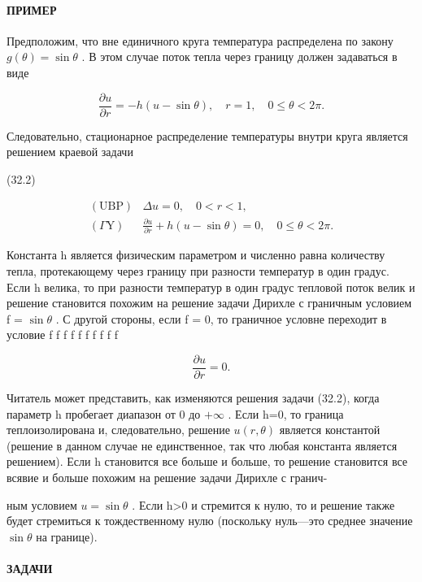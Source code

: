 \documentclass[
  ukrainian,
]{article}
\begin{document}
\paragraph{ПРИМЕР}\label{ux43fux440ux438ux43cux435ux440}

Предположим, что вне единичного круга температура распределена по закону
\(g(\theta) = \sin \theta\) . В этом случае поток тепла через границу
должен задаваться в виде

\[
\frac{\partial u}{\partial r} = -h(u - \sin \theta), \quad r = 1, \quad 0 \le \theta < 2\pi.
\]

Следовательно, стационарное распределение температуры внутри круга
является решением краевой задачи

(32.2)

\[
\begin{array}{ll} (\text{UBP}) & \Delta u = 0, \quad 0 < r < 1, \\ (\Gamma \text{Y}) & \frac{\partial u}{\partial r} + h \left( u - \sin \theta \right) = 0, \quad 0 \leqslant \theta < 2\pi. \end{array}
\]

Константа h является физическим параметром и численно равна количеству
тепла, протекающему через границу при разности температур в один градус.
Если h велика, то при разности температур в один градус тепловой поток
велик и решение становится похожим на решение задачи Дирихле с граничным
условием f = \(\sin \theta\) . С другой стороны, если f = 0, то
граничное условне переходит в условие f f f f f f f f f f

\[
\frac{\partial u}{\partial r} = 0.
\]

Читатель может представить, как изменяются решения задачи (32.2), когда
параметр h пробегает диапазон от 0 до \(+\infty\) . Если h=0, то граница
теплоизолирована и, следовательно, решение \(u(r,\theta)\) является
константой (решение в данном случае не единственное, так что любая
константа является решением). Если h становится все больше и больше, то
решение становится все всявие и больше похожим на решение задачи Дирихле
с гранич-

ным условием \(u=\sin\theta\) . Если h\textgreater0 и стремится к нулю,
то и решение также будет стремиться к тождественному нулю (поскольку
нуль---это среднее значение \(\sin\theta\) на границе).

\paragraph{ЗАДАЧИ}\label{ux437ux430ux434ux430ux447ux438-7}
\end{document}
